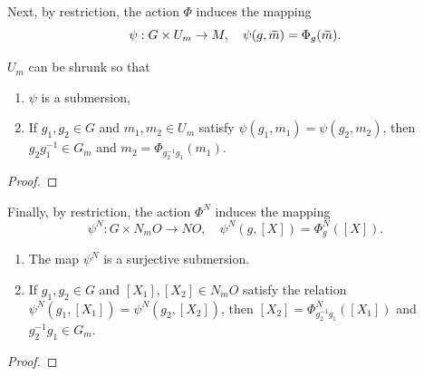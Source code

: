 Next, by restriction, the action $\Phi$ induces the mapping
\[\psi:G\times U_m\to M,\quad \psi(g,\wt{m})=\Phi_g(\wt{m}).\]

\begin{lem}[{{\cite[Lem.~6.4.5]{RS1}}}]\label{lem 6.4.5 RS1}
    $U_m$ can be shrunk so that
    \begin{enumerate}
        \item $\psi$ is a submersion,
        \item If $g_1,g_2\in G$ and $m_1,m_2\in U_m$ satisfy $\psi(g_1,m_1)=\psi(g_2,m_2)$, then $g_2g_1^{-1}\in G_m$ and $m_2=\Phi_{g_2^{-1}g_1}(m_1)$.
    \end{enumerate}
\end{lem}
\begin{proof}
    
\end{proof}


Finally, by restriction, the action $\Phi^N$ induces the mapping
\[\psi^N:G\times N_mO\to NO,\quad \psi^N(g,[X])=\Phi^N_g([X]).\label{eq 6.4.4 RS1}\]

\begin{lem}[{{\cite[Lem.~6.4.6]{RS1}}}]\label{lem 6.4.6 RS1}
    \begin{enumerate}
        \item The map $\psi^N$ is a surjective submersion.
        \item If $g_1,g_2\in G$ and $[X_1],[X_2]\in N_mO$ satisfy the relation $\psi^N(g_1,[X_1])=\psi^N(g_2,[X_2])$, then $[X_2]=\Phi^N_{g_2^{-1}g_1}([X_1])$ and $g_2^{-1}g_1\in G_m$.
    \end{enumerate}
\end{lem}
\begin{proof}
    
\end{proof}




